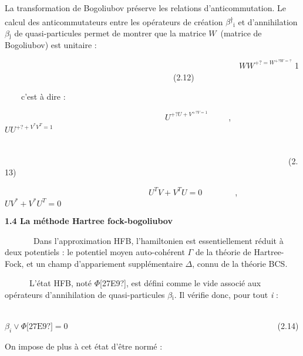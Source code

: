\documentclass[a4paper]{article}
\providecommand\textsubscript[1]{\ensuremath{{}_{\text{#1}}}}
\begin{document}
La transformation de Bogoliubov préserve les relations d’anticommutation. Le calcul des anticommutateurs entre les
opérateurs de création\textit{ $\beta $}\textsuperscript{†}\textit{\textsubscript{i}} et d’annihilation \textit{$\beta
$}\textsubscript{j} de quasi-particules permet de montrer que la matrice  $W$\ (matrice de Bogoliubov) est unitaire :

\ \ \ \ \ \ \ \ \ \ \ \ \ \ \ \ \ \ \ \ \ \ \ \ \ \ \ \ \ \ \ \ \ \ \ \ \ \ \ \ \ \ \ \ \ \ \ \ \ \ \ \ \ \ \ \ \ 
$WW^{+?=W^{+?W=?}}$ 1 \ \ \ \ \ \ \ \ \ \ \ \ \ \ \ \ \ \ \ \ \ \ \ \ \ \ \ \ \ \ \ \ \ \ \ \ \ \ \ \ \ (2.12)

\ \ \ \ c’est à dire : \ \ \ \ \ \ \ \ \ \ \ \ \ \ \ \ \ \ \ \ \ \ \ \ \ \ \ \ \ \ 

\ \ \ \ \ \ \ \ \ \ \ \ \ \ \ \ \ \ \ \ \ \ \ \ \ \ \ \ \ \ \ \ \ \ \ \ \ \ \  $U^{+?U+V^{+?V=1}}$\ \ \ \ \ ,
\ \ \ \ \ \ \ \  $UU^{+?+V^{\ast }V^T=1}$\ 

\ \ \ \ \ \ \ \ \ \ \ \ \ \ \ \ \ \ \ \ \ \ \ \ \ \ \ \ \ \ \ \ \ \ \ \ \ \ \ \ \ \ \ \ \ \ \ \ \ \ \ \ \ \ \ \ \ \ \ \ \ \ \ \ \ \ \ \ \ \ \ \ \ \ \ \ \ \ \ \ \ \ \ \ \ \ \ \ \ \ \ \ \ \ \ \ \ \ \ \ \ \ \ \ \ \ \ \ \ \ \ \ \ \ \ \ \ \ \ \ \ \ \ \ \ \ \ \ \ \ \ \ \ \ \ \ \ \ \ \ \ (2.13)

\ \ \ \ \ \ \ \ \ \ \ \ \ \ \ \ \ \ \ \ \ \ \ \ \ \ \ \ \ \ \ \ \ \ \  $U^TV+V^TU=0$\ \ \ \ \ \ \ \ , \ \ \ \ \ \ \ \ 
$UV^{\ast }+V^{\ast }U^T=0$

\textbf{1.4 La méthode Hartree fock-bogoliubov}

\ \ \ \ \ \ \ Dans l’approximation HFB, l’hamiltonien est essentiellement réduit à deux potentiels : le potentiel moyen
auto-cohérent \textcolor[rgb]{0.1254902,0.12941177,0.13333334}{$\Gamma $} de la théorie de Hartree-Fock, et un champ
d’appariement supplémentaire $\Delta $, connu de la théorie BCS.

\ \ \ \ \ \ L’état HFB, noté {\textbar}$\Phi $[27E9?], est défini comme le vide associé aux opérateurs d’annihilation de
quasi-particules \textit{$\beta $}\textit{\textsubscript{i}}. Il vérifie donc, pour tout \textit{i} :

\ \ \ \ \ \ \ \ \ \ \ \ \ \ \ \ \ \ \ \ \ \ \ \ \ \ \ \ \ \ \ \ \ \ \ \ \ \ \ \ \ \ \ \ \ \ \ \ \ \ \ \ \ \ \ \ \ \ \ \ \ \ \ \ \ \ 
$\beta _i\vee \Phi
\text{[27E9?]}=0$\ \ \ \ \ \ \ \ \ \ \ \ \ \ \ \ \ \ \ \ \ \ \ \ \ \ \ \ \ \ \ \ \ \ \ \ \ \ \ \ \ \ \ \ \ \ \ \ \ \ \ (2.14)

On impose de plus à cet état d’être normé : \ \ \ \ 
\end{document}
